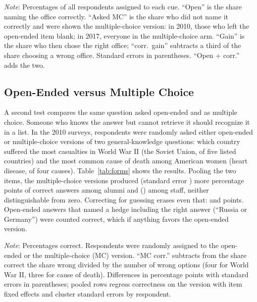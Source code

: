 \documentclass[11pt]{article}
\begin{document}
\begin{table}[htbp]
\centering\TableStyle
\caption{Multiple-choice follow-ups to open-ended identification questions.}
\label{tab:probes}
\begin{minipage}{0.95\linewidth}\footnotesize
\emph{Note}: Percentages of all respondents assigned to each cue. ``Open'' is the share naming the office correctly. ``Asked MC'' is the share who did not name it correctly and were shown the multiple-choice version: in 2010, those who left the open-ended item blank; in 2017, everyone in the multiple-choice arm. ``Gain'' is the share who then chose the right office; ``corr.\ gain'' subtracts a third of the share choosing a wrong office. Standard errors in parentheses. ``Open + corr.'' adds the two.
\end{minipage}
\end{table}

\subsection{Open-Ended versus Multiple Choice}

A second test compares the same question asked open-ended and as multiple choice. Someone who knows the answer but cannot retrieve it should recognize it in a list. In the 2010 surveys, respondents were randomly asked either open-ended or multiple-choice versions of two general-knowledge questions: which country suffered the most casualties in World War II (the Soviet Union, of five listed countries) and the most common cause of death among American women (heart disease, of four causes). Table~\ref{tab:forms} shows the results. Pooling the two items, the multiple-choice versions produced \formAlumni{} (standard error \formAlumniSe) more percentage points of correct answers among alumni and \formStaff{} (\formStaffSe) among staff, neither distinguishable from zero. Correcting for guessing erases even that: \formCorrAlumni{} and \formCorrStaff{} points. Open-ended answers that named a hedge including the right answer (``Russia or Germany'') were counted correct, which if anything favors the open-ended version.

\begin{table}[htbp]
\centering\TableStyle
\caption{Correct answers to open-ended and multiple-choice versions of two questions.}
\label{tab:forms}
\begin{minipage}{0.95\linewidth}\footnotesize
\emph{Note}: Percentages correct. Respondents were randomly assigned to the open-ended or the multiple-choice (MC) version. ``MC corr.'' subtracts from the share correct the share wrong divided by the number of wrong options (four for World War II, three for cause of death). Differences in percentage points with standard errors in parentheses; pooled rows regress correctness on the version with item fixed effects and cluster standard errors by respondent.
\end{minipage}
\end{table}
\end{document}
